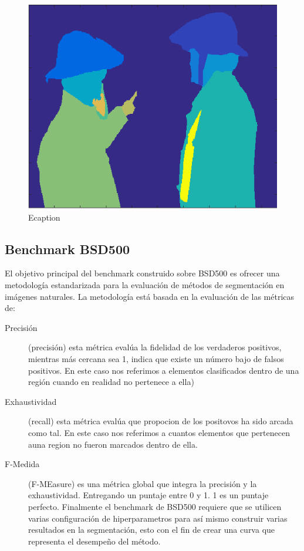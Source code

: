 \documentclass[10pt,twocolumn,letterpaper]{article}
\begin{document}
\begin{figure}

\includegraphics[width=0.85\linewidth]
                   {img/Imagesc.png}
   \caption{Ecaption}
\label{fig:short2}
\end{figure}


\subsection{Benchmark  BSD500}
El objetivo principal del benchmark construido sobre BSD500 es ofrecer una metodología estandarizada para la evaluación de métodos de segmentación en imágenes naturales. La metodología está basada en la evaluación de las métricas de:
\begin{description}


\item[Precisión] (precisión) esta métrica evalúa la fidelidad de los verdaderos positivos, mientras más cercana sea 1, indica que existe un número bajo de falsos positivos. En este caso nos referimos a elementos clasificados dentro de una región cuando en realidad no pertenece a ella) 

\item[Exhaustividad] (recall) esta métrica evalúa que propocion  de los positovos ha sido arcada como tal. En este caso nos referimos a cuantos elementos que pertenecen auna region no fueron marcados dentro de ella.

\item[F-Medida] (F-MEasure)  es una métrica global que integra la precisión y la exhaustividad. Entregando un puntaje entre 0 y 1. 1 es un puntaje perfecto.
Finalmente el benchmark de BSD500 requiere que se utilicen varias configuración de hiperparametros para así mismo construir varias resultados en la segmentación,  esto con el fin de crear una curva que representa el desempeño del método.
\end{description}
\end{document}
